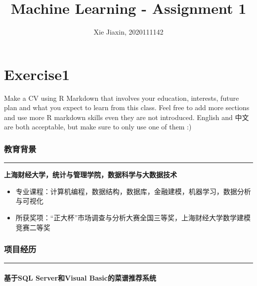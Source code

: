 \documentclass[
]{article}
\title{Machine Learning - Assignment 1}
\author{Xie Jiaxin, 2020111142}
\date{}
\providecommand{\tightlist}{%
  \setlength{\itemsep}{0pt}\setlength{\parskip}{0pt}}
\begin{document}
\maketitle

\hypertarget{exercise1}{%
\section{Exercise1}\label{exercise1}}

Make a CV using R Markdown that involves your education, interests,
future plan and what you expect to learn from this class. Feel free to
add more sections and use more R markdown skills even they are not
introduced. English and 中文 are both acceptable, but make sure to only
use one of them :)

\hypertarget{ux6559ux80b2ux80ccux666f}{%
\subsubsection{教育背景}\label{ux6559ux80b2ux80ccux666f}}

\begin{center}\rule{0.5\linewidth}{0.5pt}\end{center}

\textbf{上海财经大学，统计与管理学院，数据科学与大数据技术}

\begin{itemize}
\tightlist
\item
  专业课程：计算机编程，数据结构，数据库，金融建模，机器学习，数据分析与可视化
\item
  所获奖项：``正大杯''市场调查与分析大赛全国三等奖，上海财经大学数学建模竞赛二等奖
\end{itemize}

\hypertarget{ux9879ux76eeux7ecfux5386}{%
\subsubsection{项目经历}\label{ux9879ux76eeux7ecfux5386}}

\begin{center}\rule{0.5\linewidth}{0.5pt}\end{center}

\hypertarget{ux57faux4e8esql-serverux548cvisual-basicux7684ux83dcux8c31ux63a8ux8350ux7cfbux7edf}{%
\paragraph{基于SQL Server和Visual
Basic的菜谱推荐系统}\label{ux57faux4e8esql-serverux548cvisual-basicux7684ux83dcux8c31ux63a8ux8350ux7cfbux7edf}}
\end{document}
